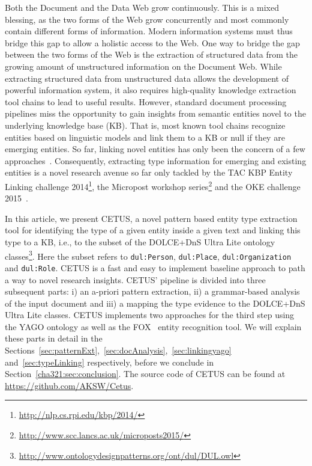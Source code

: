 Both the Document and the Data Web grow continuously. This is a mixed blessing, as the two forms of the Web grow concurrently and most commonly contain different forms of information. Modern information systems must thus bridge this gap to allow a holistic access to the Web. One way to bridge the gap between the two forms of the Web is the extraction of structured data from the growing amount of unstructured information on the Document Web. 
While extracting structured data from unstructured data allows the development of powerful information system, it also requires high-quality knowledge extraction tool chains to lead to useful results. 
However, standard document processing pipelines miss the opportunity to gain insights from semantic entities novel to the underlying knowledge base (KB). 
That is, most known tool chains recognize entities based on linguistic models and link them to a KB or null if they are emerging entities. 
So far, linking novel entities has only been the concern of a few approaches~\cite{AIDA,agdistis_iswc}.
Consequently, extracting type information for emerging and existing entities is a novel research avenue so far only tackled by the TAC KBP Entity Linking challenge 2014\footnote{\url{http://nlp.cs.rpi.edu/kbp/2014/}}, the Micropost workshop series\footnote{\url{http://www.scc.lancs.ac.uk/microposts2015/}} and the OKE challenge 2015~\cite{okechallenge}.

In this article, we present CETUS, a novel pattern based entity type extraction tool for identifying the type of a given entity inside a given text and linking this type to a KB, i.e., to the subset of the DOLCE+DnS Ultra Lite ontology classes\footnote{\url{http://www.ontologydesignpatterns.org/ont/dul/DUL.owl}}.
Here the subset refers to \texttt{dul:Person}, \texttt{dul:Place}, \texttt{dul:Organization} and \texttt{dul:Role}.
CETUS is a fast and easy to implement baseline approach to path a way to novel research insights.
CETUS' pipeline is divided into three subsequent parts: i) an a-priori pattern extraction, ii) a grammar-based analysis of the input document and iii) a mapping the type evidence to the DOLCE+DnS Ultra Lite classes. 
CETUS implements two approaches for the third step using the YAGO ontology as well as the FOX~\cite{FOX} entity recognition tool.
We will explain these parts in detail in the Sections~\ref{sec:patternExt},~\ref{sec:docAnalysis},~\ref{sec:linkingyago} and~\ref{sec:typeLinking} respectively, before we conclude in Section~\ref{cha321:sec:conclusion}. The source code of CETUS can be found at \url{https://github.com/AKSW/Cetus}.


